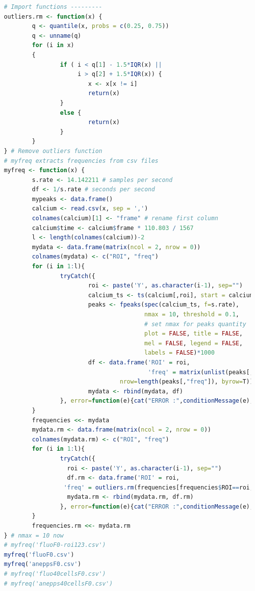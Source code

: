\documentclass{biophys-new}
\begin{document}
\begin{lstlisting}[language=R]
# Import functions ---------
outliers.rm <- function(x) {
        q <- quantile(x, probs = c(0.25, 0.75))
        q <- unname(q)
        for (i in x)
        {
                if ( i < q[1] - 1.5*IQR(x) ||
                     i > q[2] + 1.5*IQR(x)) {
                        x <- x[x != i]
                        return(x)
                }
                else {
                        return(x)
                }
        }
} # Remove outliers function
# myfreq extracts frequencies from csv files
myfreq <- function(x) {
        s.rate <- 14.142211 # samples per second
        df <- 1/s.rate # seconds per second
        mypeaks <- data.frame()
        calcium <- read.csv(x, sep = ',')
        colnames(calcium)[1] <- "frame" # rename first column
        calcium$time <- calcium$frame * 110.803 / 1567
        l <- length(colnames(calcium))-2
        mydata <- data.frame(matrix(ncol = 2, nrow = 0))
        colnames(mydata) <- c("ROI", "freq")
        for (i in 1:l){
                tryCatch({
                        roi <- paste('Y', as.character(i-1), sep="")
                        calcium_ts <- ts(calcium[,roi], start = calcium$time[1])
                        peaks <- fpeaks(spec(calcium_ts, f=s.rate),
                                        nmax = 10, threshold = 0.1,
                                        # set nmax for peaks quantity
                                        plot = FALSE, title = FALSE,
                                        mel = FALSE, legend = FALSE,
                                        labels = FALSE)*1000
                        df <- data.frame('ROI' = roi,
                                         'freq' = matrix(unlist(peaks[,"freq"]),
                                 nrow=length(peaks[,"freq"]), byrow=T))
                        mydata <- rbind(mydata, df)
                }, error=function(e){cat("ERROR :",conditionMessage(e), "\n")})
        }
        frequencies <<- mydata
        mydata.rm <- data.frame(matrix(ncol = 2, nrow = 0))
        colnames(mydata.rm) <- c("ROI", "freq")
        for (i in 1:l){
                tryCatch({
                  roi <- paste('Y', as.character(i-1), sep="")
                  df.rm <- data.frame('ROI' = roi,
                 'freq' = outliers.rm(frequencies[frequencies$ROI==roi,]$freq))
                  mydata.rm <- rbind(mydata.rm, df.rm)
                }, error=function(e){cat("ERROR :",conditionMessage(e), "\n")})
        }
        frequencies.rm <<- mydata.rm
} # nmax = 10 now
# myfreq('fluoF0-roi123.csv')
myfreq('fluoF0.csv')
myfreq('aneppsF0.csv')
# myfreq('fluo40cellsF0.csv')
# myfreq('anepps40cellsF0.csv')

\end{lstlisting}
\end{document}
